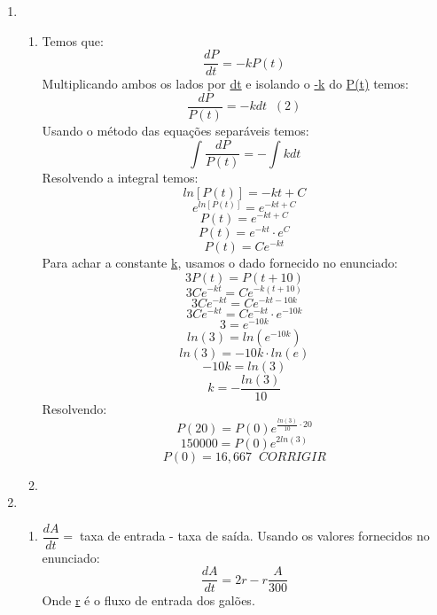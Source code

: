 \documentclass[a4paper, 12pt]{article}
\begin{document}
	\begin{enumerate}
		\item
			\begin{enumerate}
				\item
					Temos que:
					$$\dfrac{dP}{dt} = -kP(t)$$
					Multiplicando ambos os lados por \underline{dt} e isolando o \underline{-k} do \underline{P(t)} temos:
					$$\dfrac{dP}{P(t)} = -kdt \;\;(2)$$
					Usando o método das equações separáveis temos:
					$$\int\dfrac{dP}{P(t)} = -\int kdt$$
					Resolvendo a integral temos:
					$$ln[P(t)] = -kt+C$$
					$$\textit{e}^{ln[P(t)]} = \textit{e}^{-kt+C}$$
					$$P(t) = \textit{e}^{-kt+C}$$
					$$P(t) = \textit{e}^{-kt}\cdot\textit{e}^C$$
					$$P(t) = C\textit{e}^{-kt}$$
					Para achar a constante \underline{k}, usamos o dado fornecido no enunciado:
					$$3P(t) = P(t+10)$$
					$$3C\textit{e}^{-kt} = C\textit{e}^{-k(t+10)}$$
					$$3C\textit{e}^{-kt} = C\textit{e}^{-kt-10k}$$
					$$3C\textit{e}^{-kt} = C\textit{e}^{-kt}\cdot\textit{e}^{-10k}$$
					$$3 = \textit{e}^{-10k}$$
					$$ln (3) = ln(\textit{e}^{-10k})$$
					$$ln (3) = -10k\cdot ln(\textit{e})$$
					$$-10k = ln(3)$$
					$$k = -\dfrac{ln (3)}{10}$$
					Resolvendo:
					$$P(20) = P(0)e^{\frac{ln (3)}{10}\cdot 20}$$
					$$150000 = P(0)e^{2ln(3)}$$
					$$P(0) = 16,667\;\;CORRIGIR$$
				\item
		\end{enumerate}
		\item
			\begin{enumerate}
				\item
					$\dfrac{dA}{dt} =\;$taxa de entrada - taxa de saída. Usando os valores fornecidos no enunciado:					
					$$\dfrac{dA}{dt} = 2r - r\dfrac{A}{300}$$
					Onde \underline{r} é o fluxo de entrada dos galões.
					

\end{enumerate}
\end{enumerate}
\end{document}
